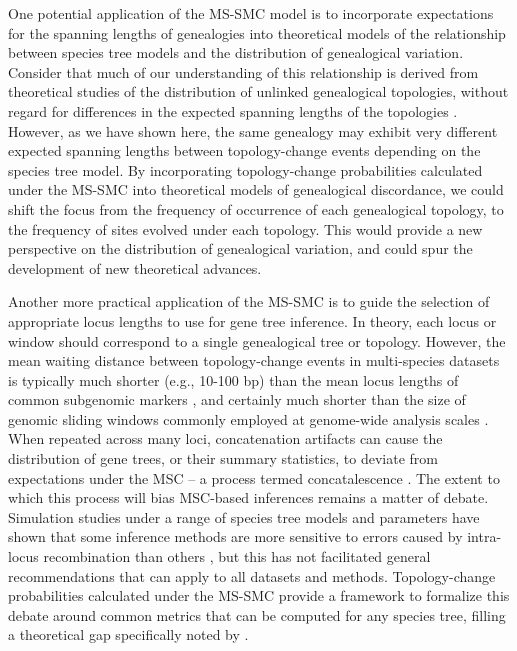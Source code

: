 \documentclass[11pt]{article}
\begin{document}
One potential application of the MS-SMC model is to incorporate expectations
for the spanning lengths of genealogies into theoretical models of the
relationship between species tree models and the distribution of
genealogical variation.
% 
Consider that much of our understanding of this relationship is derived
from theoretical studies of the distribution of unlinked genealogical
topologies, without regard for differences in the expected spanning 
lengths of the topologies
\citep{degnan2005gene,degnan2006discordance}.
% 
However, as we have shown here, the same genealogy may exhibit 
very different expected spanning lengths between topology-change events
depending on the species tree model.
% 
By incorporating topology-change probabilities calculated under the
MS-SMC into theoretical models of genealogical discordance, we could shift
the focus from the frequency of occurrence of each genealogical topology, 
to the frequency of sites evolved under each topology. This would provide
a new perspective on the distribution of genealogical variation, and could
spur the development of new theoretical advances.


Another more practical application of the MS-SMC 
is to guide the selection of appropriate locus lengths to use for gene
tree inference. In theory, each locus or window should correspond to a
single genealogical tree or topology.
% 
However, the mean waiting distance between topology-change events in
multi-species datasets is typically much shorter (e.g., 10-100 bp) than the 
mean locus lengths of common subgenomic markers 
\citep[e.g., $>$300 bp;][]{mckenzie_multispecies_2020},
and certainly much shorter than the size of genomic sliding windows 
commonly employed at genome-wide analysis scales 
\citep[e.g., 100 Kb;][]{li2019recombination}.
When repeated across many loci, concatenation artifacts can cause the distribution
of gene trees, or their summary statistics, to deviate from expectations under
the MSC -- a process termed concatalescence \citep{gatesy_concatenation_2013}.
% 
The extent to which this process will bias MSC-based inferences remains
a matter of debate.
Simulation studies under a range of species tree models and parameters
have shown that some inference methods are more sensitive to errors caused
by intra-locus recombination than others
\citep{lanier2012recombination,zhu2022simulation}, but this has not 
facilitated general recommendations that can apply to all datasets and 
methods.
% 
Topology-change probabilities calculated under the MS-SMC provide a framework
to formalize this debate around common metrics that can be computed for any 
species tree, filling a theoretical gap specifically noted by 
\citet{zhu2022simulation}.
\end{document}
